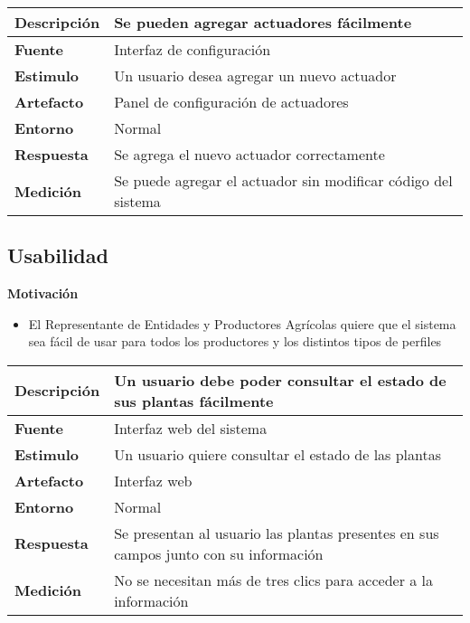 \begin{tabular}{| l || p{12cm} |}
\hline 
\textbf{Descripci\'on} & Se pueden agregar actuadores fácilmente \\
\hline 
\textbf{Fuente} & Interfaz de configuración \\
\hline 
\textbf{Estimulo} & Un usuario desea agregar un nuevo actuador \\
\hline 
\textbf{Artefacto} & Panel de configuración de actuadores \\
\hline 
\textbf{Entorno} & Normal \\
\hline 
\textbf{Respuesta} & Se agrega el nuevo actuador correctamente \\
\hline 
\textbf{Medici\'on} & Se puede agregar el actuador sin modificar código del sistema \\
\hline 
\end{tabular}

\subsection{Usabilidad}
\textbf{Motivación}
\begin{itemize}
 \item El Representante de Entidades y Productores Agr\'icolas quiere que el sistema sea f\'acil de usar para todos los productores y los distintos tipos de perfiles
\end{itemize}

\begin{tabular}{| l || p{12cm} |}
\hline 
\textbf{Descripci\'on} & Un usuario debe poder consultar el estado de sus plantas fácilmente \\
\hline 
\textbf{Fuente} & Interfaz web del sistema \\
\hline 
\textbf{Estimulo} & Un usuario quiere consultar el estado de las plantas \\
\hline 
\textbf{Artefacto} & Interfaz web \\
\hline 
\textbf{Entorno} & Normal \\
\hline 
\textbf{Respuesta} & Se presentan al usuario las plantas presentes en sus campos junto con su información \\
\hline 
\textbf{Medici\'on} & No se necesitan más de tres clics para acceder a la información \\
\hline 
\end{tabular}